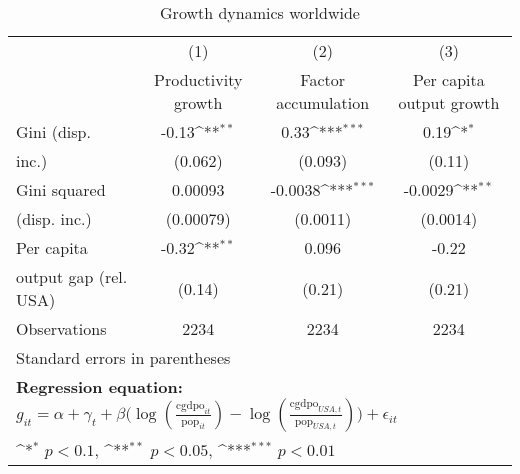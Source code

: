 \begin{table}[htbp]\centering
\def\sym#1{\ifmmode^{#1}\else\(^{#1}\)\fi}
\caption{Growth dynamics worldwide}
\begin{tabular}{l*{3}{c}}
\hline\hline
                &\multicolumn{1}{c}{(1)}&\multicolumn{1}{c}{(2)}&\multicolumn{1}{c}{(3)}\\
                &\multicolumn{1}{c}{Productivity growth}&\multicolumn{1}{c}{Factor accumulation}&\multicolumn{1}{c}{Per capita output growth}\\
\hline
Gini (disp.     &    -0.13\sym{**} &     0.33\sym{***}&     0.19\sym{*}  \\
inc.)           &  (0.062)         &  (0.093)         &   (0.11)         \\
[1em]
Gini squared    &  0.00093         &  -0.0038\sym{***}&  -0.0029\sym{**} \\
(disp. inc.)    &(0.00079)         & (0.0011)         & (0.0014)         \\
[1em]
Per capita      &    -0.32\sym{**} &    0.096         &    -0.22         \\
output gap (rel. USA)&   (0.14)         &   (0.21)         &   (0.21)         \\
\hline
Observations    &     2234         &     2234         &     2234         \\
\hline\hline
\multicolumn{4}{l}{\footnotesize Standard errors in parentheses}\\
\multicolumn{4}{l}{\footnotesize \textbf{Regression equation:} \(g_{it} = \alpha + \gamma_t + \beta \big(\log (\frac{\textrm{cgdpo}_{it}}{\textrm{pop}_{it}} ) - \log (\frac{\textrm{cgdpo}_{USA,t}}{\textrm{pop}_{USA,t}}  ) \big) + \epsilon_{it}\)}\\
\multicolumn{4}{l}{\footnotesize \sym{*} \(p<0.1\), \sym{**} \(p<0.05\), \sym{***} \(p<0.01\)}\\
\end{tabular}
\end{table}

